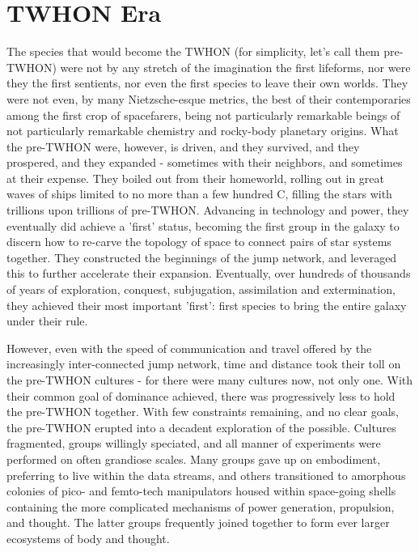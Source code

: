 \section{TWHON Era}
The species that would become the TWHON (for simplicity, let's call 
them pre-TWHON) were not by any stretch of the imagination the first 
lifeforms, nor were they the first sentients, nor even the first 
species to leave their own worlds. They were not even, by many 
Nietzsche-esque metrics, the best of their contemporaries among the first 
crop of spacefarers, being not particularly remarkable beings of not 
particularly remarkable chemistry and rocky-body planetary 
origins. What the pre-TWHON were, however, is driven, and they 
survived, and they prospered, and they expanded - sometimes with their 
neighbors, and sometimes at their expense. They boiled out from their 
homeworld, rolling out in great waves of ships limited to no more than 
a few hundred C, filling the stars with trillions upon trillions of 
pre-TWHON. Advancing in technology and power, they eventually did 
achieve a 'first' status, becoming the first group in the galaxy to 
discern how to re-carve the topology of space to connect pairs of star 
systems together. They constructed the beginnings of the jump network, 
and leveraged this to further accelerate their expansion. Eventually, 
over hundreds of thousands of years of exploration, conquest, 
subjugation, assimilation and extermination, they achieved their most 
important 'first': first species to bring the entire galaxy under 
their rule. 

However, even with the speed of communication and travel offered by 
the increasingly inter-connected jump network, time and distance took 
their toll on the pre-TWHON cultures - for there were many cultures 
now, not only one. With their common goal of dominance achieved, there 
was progressively less to hold the pre-TWHON together. With few 
constraints remaining, and no clear goals, the pre-TWHON erupted into 
a decadent exploration of the possible. Cultures fragmented, groups 
willingly speciated, and all manner of experiments were performed on 
often grandiose scales. Many groups gave up on embodiment, preferring 
to live within the data streams, and others transitioned to amorphous 
colonies of pico- and femto-tech manipulators housed within 
space-going shells containing the more complicated mechanisms of power 
generation, propulsion, and thought. The latter groups frequently 
joined together to form ever larger ecosystems of body and thought. 

